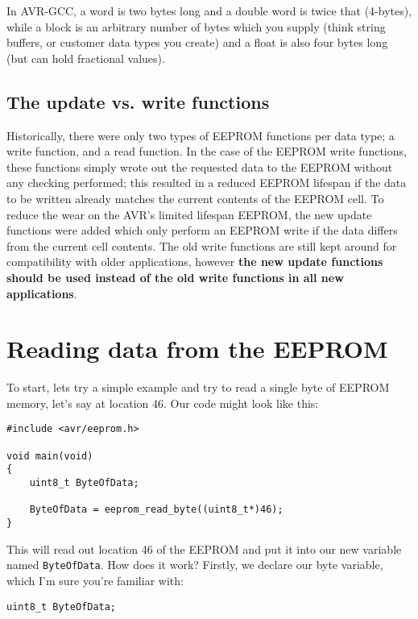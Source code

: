 \documentclass[a4paper,oneside,notitlepage]{book}
\begin{document}
In AVR-GCC, a word is two bytes long and a double word is twice that (4-bytes), while a block is an arbitrary number of bytes which you supply (think string buffers, or customer data types you create) and a float is also four bytes long (but can hold fractional values).

\section{The update vs. write functions}

Historically, there were only two types of EEPROM functions per data type; a write function, and a read function. In the case of the EEPROM write functions, these functions simply wrote out the requested data to the EEPROM without any checking performed; this resulted in a reduced EEPROM lifespan if the data to be written already matches the current contents of the EEPROM cell. To reduce the wear on the AVR's limited lifespan EEPROM, the new update functions were added which only perform an EEPROM write if the data differs from the current cell contents. The old write functions are still kept around for compatibility with older applications, however \textbf{the new update functions should be used instead of the old write functions in all new applications}.


\chapter{Reading data from the EEPROM}

To start, lets try a simple example and try to read a single byte of EEPROM memory, let's say at location 46. Our code might look like this:

\begin{center}
\begin{lstlisting}
#include <avr/eeprom.h>

void main(void)
{
    uint8_t ByteOfData;

    ByteOfData = eeprom_read_byte((uint8_t*)46);
}
\end{lstlisting}
\end{center}

This will read out location 46 of the EEPROM and put it into our new variable named \lstinline{ByteOfData}. How does it work? Firstly, we declare our byte variable, which I'm sure you're familiar with:

\begin{center}
\begin{lstlisting}
uint8_t ByteOfData;
\end{lstlisting}
\end{center}
\end{document}
